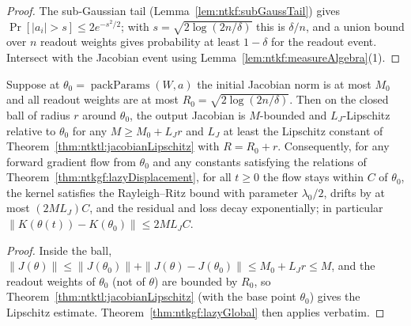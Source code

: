 \begin{proof}
  \leanok
The sub-Gaussian tail (Lemma~\ref{lem:ntkf:subGaussTail}) gives $\Pr[|a_i|>s]\le2e^{-s^2/2}$; with $s=\sqrt{2\log(2n/\delta)}$ this is $\delta/n$, and a union bound over $n$ readout weights gives probability at least $1-\delta$ for the readout event.
Intersect with the Jacobian event using Lemma~\ref{lem:ntkf:measureAlgebra}(1).
\end{proof}

\begin{theorem}\label{thm:ntktl:ballBounds}
  \leanok
Suppose at $\theta_0=\operatorname{packParams}(W,a)$ the initial Jacobian norm is at most $M_0$ and all readout weights are at most $R_0=\sqrt{2\log(2n/\delta)}$. Then on the closed ball of radius $r$ around $\theta_0$, the output Jacobian is $M$-bounded and
$L_J$-Lipschitz relative to $\theta_0$ for any $M\ge M_0+L_Jr$ and $L_J$ at least the Lipschitz constant of Theorem~\ref{thm:ntktl:jacobianLipschitz} with $R=R_0+r$. Consequently, for any forward gradient flow from $\theta_0$ and any constants satisfying the
relations of Theorem~\ref{thm:ntkgf:lazyDisplacement}, for all $t\ge0$ the flow stays within $C$ of $\theta_0$, the kernel satisfies the Rayleigh--Ritz bound with parameter $\lambda_0/2$, drifts by at most $(2ML_J)C$, and the residual and loss decay exponentially;
in particular $\|K(\theta(t))-K(\theta_0)\|\le2ML_JC$.
\end{theorem}

\begin{proof}
  \leanok
Inside the ball, $\|J(\theta)\|\le\|J(\theta_0)\|+\|J(\theta)-J(\theta_0)\|\le M_0+L_Jr\le M$, and the readout weights of $\theta_0$ (not of $\theta$) are bounded by $R_0$, so Theorem~\ref{thm:ntktl:jacobianLipschitz} (with the base point $\theta_0$) gives the Lipschitz estimate.
Theorem~\ref{thm:ntkgf:lazyGlobal} then applies verbatim.
\end{proof}

